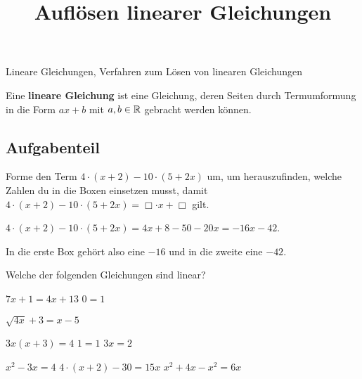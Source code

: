 \documentclass[solution]{uebungsblatt}
\title{Auflösen linearer Gleichungen}
\begin{document}
\maketitle
\begin{contents}
    Lineare Gleichungen, Verfahren zum Lösen von linearen Gleichungen
\end{contents}


\begin{definition}
    Eine \textbf{lineare Gleichung} ist eine Gleichung, deren Seiten durch Termumformung in die Form $ax+b$ mit $a,b\in\mathbb{R}$ gebracht werden können.
\end{definition}

\subsection*{Aufgabenteil}

\begin{exercise}
    Forme den Term $4\cdot (x+2)-10\cdot (5+2x)$ um, um herauszufinden, welche Zahlen du in die Boxen einsetzen musst, damit $4\cdot (x+2)-10\cdot (5+2x)=\Box\cdot x+\Box$ gilt.
    \begin{answerbox}[.5in]
        $4\cdot (x+2)-10\cdot (5+2x)=4x+8-50-20x=-16x-42$. 
        
        In die erste Box gehört also eine $-16$ und in die zweite eine $-42$.
    \end{answerbox}
\end{exercise}

\begin{exercise}
    Welche der folgenden Gleichungen sind linear?
    \begin{multicols}{3}
        \begin{multiplechoice}
            \citem $7x+1=4x+13$
            \citem $0=1$
            \item $\sqrt{4x}+3=x-5$
            \item $3x(x+3)=4$
            \citem $1=1$
            \citem $3x=2$
            \item $x^2-3x=4$
            \citem $4\cdot (x+2)-30=15x$
            \citem $x^2 + 4x - x^2=6x$
        \end{multiplechoice}
    \end{multicols}
\end{exercise}
\end{document}
